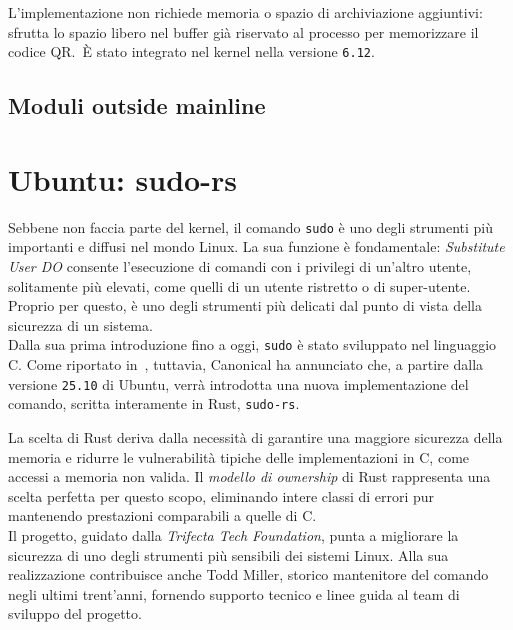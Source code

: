 L'implementazione non richiede memoria o spazio di archiviazione aggiuntivi: sfrutta lo spazio 
libero nel buffer già riservato al processo per memorizzare il codice QR.\ 
È stato integrato nel kernel nella versione \texttt{6.12}.

\subsection{Moduli outside mainline}

\section{Ubuntu: sudo-rs}
Sebbene non faccia parte del kernel, il comando \texttt{sudo} è uno degli strumenti più importanti e diffusi nel mondo Linux.
La sua funzione è fondamentale: \textit{Substitute User DO} consente l'esecuzione di comandi con i privilegi di un'altro utente, solitamente più elevati,
come quelli di un utente ristretto o di super-utente.
Proprio per questo, è uno degli strumenti più delicati dal punto di vista della sicurezza di un sistema. \hfill
\vspace{5pt}\\
\noindent Dalla sua prima introduzione fino a oggi, \texttt{sudo} è stato sviluppato nel linguaggio C. Come riportato in~\cite{ubuntu-sudo-rs}, tuttavia, Canonical ha annunciato che,
a partire dalla versione \texttt{25.10} di Ubuntu, verrà introdotta una nuova implementazione del comando, scritta interamente in Rust, \texttt{sudo-rs}.

La scelta di Rust deriva dalla necessità di garantire una maggiore sicurezza della memoria e ridurre le vulnerabilità
tipiche delle implementazioni in C, come accessi a memoria non valida. Il \textit{modello di ownership} di Rust 
rappresenta una scelta perfetta per questo scopo, eliminando intere classi di errori pur mantenendo prestazioni comparabili a quelle di C. \hfill
\vspace{10pt}\\
\noindent Il progetto, guidato dalla \textit{Trifecta Tech Foundation}, punta a migliorare la sicurezza di uno degli strumenti più sensibili dei sistemi Linux.
Alla sua realizzazione contribuisce anche Todd Miller, storico mantenitore del comando negli ultimi trent'anni, fornendo supporto tecnico e linee guida 
al team di sviluppo del progetto.

